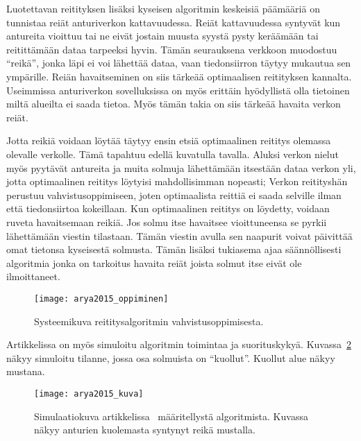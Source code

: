Luotettavan reitityksen lisäksi kyseisen algoritmin keskeisiä päämääriä on
tunnistaa reiät anturiverkon kattavuudessa. Reiät kattavuudessa syntyvät kun
antureita vioittuu tai ne eivät jostain muusta syystä pysty keräämään tai
reitittämään dataa tarpeeksi hyvin. Tämän seurauksena verkkoon muodostuu
``reikä'', jonka läpi ei voi lähettää dataa, vaan tiedonsiirron täytyy mukautua
sen ympärille. Reiän havaitseminen on siis tärkeää optimaalisen reitityksen
kannalta. Useimmissa anturiverkon sovelluksissa on myös erittäin hyödyllistä
olla tietoinen miltä alueilta ei saada tietoa. Myös tämän takia on siis tärkeää
havaita verkon reiät.

Jotta reikiä voidaan löytää täytyy ensin etsiä optimaalinen reititys olemassa
olevalle verkolle. Tämä tapahtuu edellä kuvatulla tavalla. Aluksi verkon nielut
myös pyytävät antureita ja muita solmuja lähettämään itsestään dataa verkon
yli, jotta optimaalinen reititys löytyisi mahdollisimman nopeasti; Verkon
reitityshän perustuu vahvistusoppimiseen, joten optimaalista reittiä ei saada
selville ilman että tiedonsiirtoa kokeillaan. Kun optimaalinen reititys on
löydetty, voidaan ruveta havaitsemaan reikiä. Jos solmu itse havaitsee
vioittuneensa se pyrkii lähettämään viestin tilastaan. Tämän viestin avulla sen
naapurit voivat päivittää omat tietonsa kyseisestä solmusta. Tämän lisäksi
tukiasema ajaa säännöllisesti algoritmia jonka on tarkoitus havaita reiät
joista solmut itse eivät ole ilmoittaneet.

\begin{figure}[h]
  \centering
  \texttt{[image: arya2015\_oppiminen]}
  \caption{Systeemikuva reititysalgoritmin vahvistusoppimisesta.~\parencite{Arya2015}}
\label{fig:arya2015_oppiminen}
\end{figure}

Artikkelissa on myös simuloitu algoritmin toimintaa ja suorituskykyä.
Kuvassa~\ref{fig:arya2015} näkyy simuloitu tilanne, jossa osa solmuista on
``kuollut''. Kuollut alue näkyy mustana.

\begin{figure}[h]
  \centering
  \texttt{[image: arya2015\_kuva]}
  \caption{Simulaatiokuva artikkelissa~\cite{Arya2015} määritellystä
algoritmista. Kuvassa näkyy anturien kuolemasta syntynyt reikä mustalla.}
\label{fig:arya2015}
\end{figure}

